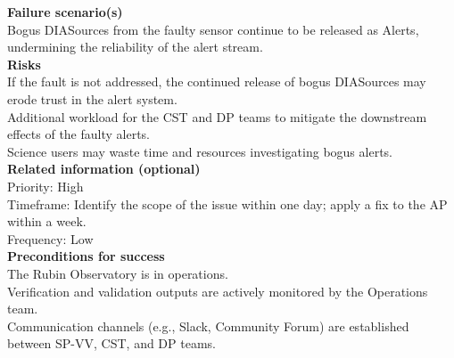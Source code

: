 \textbf {Failure scenario(s)} \\
Bogus DIASources from the faulty sensor continue to be released as Alerts, undermining the reliability of the alert stream.\\

\textbf {Risks}\\
If the fault is not addressed, the continued release of bogus DIASources may erode trust in the alert system.\\
Additional workload for the CST and DP teams to mitigate the downstream effects of the faulty alerts.\\
Science users may waste time and resources investigating bogus alerts.\\

\textbf {Related information (optional)} \\
Priority: High \\
Timeframe: Identify the scope of the issue within one day; apply a fix to the AP within a week. \\
Frequency: Low \\

\textbf {Preconditions for success}\\
The Rubin Observatory is in operations. \\
Verification and validation outputs are actively monitored by the Operations team. \\
Communication channels (e.g., Slack, Community Forum) are established between SP-VV, CST, and DP teams. \\

